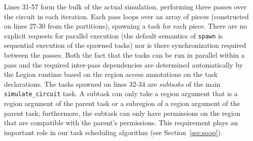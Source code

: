 


Lines 31-57 form the bulk of the actual simulation, performing three
passes over the circuit in each iteration.  Each pass loops over an
array of pieces (constructed on lines 27-30 from the partitions),
spawning a task for each piece.  There are no explicit requests for
parallel execution (the default semantics of {\tt spawn} is sequential
execution of the spawned tasks) nor is there synchronization required
between the passes.  Both the fact that the tasks can be run in
parallel within a pass and the required inter-pass dependencies are
determined automatically by the Legion runtime based on the region
access annotations on the task declarations.  The tasks spawned on
lines 32-34 are {\em subtasks} of the main {\tt simulate\_circuit}
task. A subtask can only take a region argument that is a region argument of the
parent task or a subregion of a region argument of the parent task;
furthermore, the subtask 
can only have permissions on the region that are compatible with the parent's 
permissions.   This requirement
plays an important role in our task scheduling algorithm (see
Section~\ref{sec:soop}).

